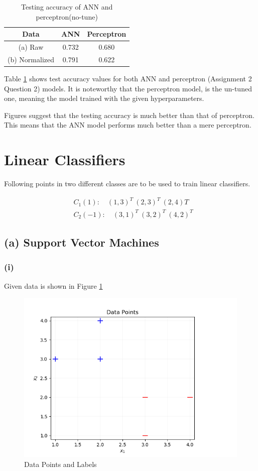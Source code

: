 \documentclass[11pt]{article}
\begin{document}
\bgroup
\def\arraystretch{1.5}%
\begin{table}[H]
\centering
\caption{Testing accuracy of ANN and perceptron(no-tune)}
\begin{tabular}{|c|c|c|}
\hline
Data        &  ANN      & Perceptron \\ \hline
(a) Raw         &  0.732    & 0.680  \\ \hline
(b) Normalized  &  0.791    & 0.622  \\ \hline
\end{tabular}
\label{table:q1acc}
\end{table}
\egroup

Table \ref{table:q1acc} shows test accuracy values for both ANN and perceptron (Assignment 2 Question 2) models. It is noteworthy that the perceptron model, is the un-tuned one, meaning the model trained with the given hyperparameters.\medskip

Figures suggest that the testing accuracy is much better than that of perceptron. This means that the ANN model performs much better than a mere perceptron. 

\newpage
\section{Linear Classifiers}

Following points in two different classes are to be used to train linear classifiers.

\begin{align*}
    &C_1 (1):  \quad (1, 3)^T \ (2, 3)^T \ (2, 4)T  \\
    &C_2 (-1): \quad (3, 1)^T \ (3, 2)^T \ (4, 2)^T
\end{align*}

\subsection*{(a) Support Vector Machines} 
\subsubsection*{(i)}

Given data is shown in Figure \ref{fig:data}
\begin{figure}[H]
\centering
\includegraphics[width=0.65\columnwidth]{pics/data.png}
\captionsetup{justification=centering}
\caption{Data Points and Labels}
\label{fig:data}
\end{figure}
\end{document}
